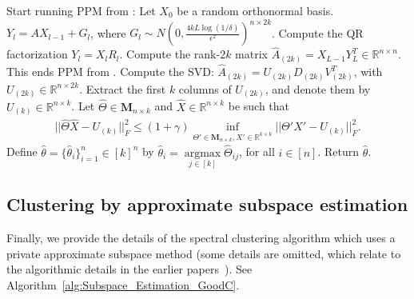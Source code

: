 \documentclass{article}
\begin{document}
\begin{algorithm}[h!]
\caption{Spectral Clustering via Matrix Estimation}
\label{alg:Matrix_Estimation_hardt2014}
\begin{algorithmic}[1]
    \State Start running PPM from \cite{hardt2014noisy}: Let $X_0$ be a random orthonormal basis.
    \State $Y_l = AX_{l - 1} +G_l$, where $G_l \sim N\left(0, \frac{4kL\log(1/\delta)}{\epsilon^2}\right)^{n \times 2k}$.
    \State Compute the QR factorization $Y_l = X_lR_l$.
    \EndFor
    \State Compute the rank-$2k$ matrix $\hat{A}_{(2k)} = X_{L - 1}Y_L^T \in \mathbb{R}^{n \times n}$. This ends PPM from \cite{hardt2014noisy}.
    \State Compute the SVD: $\hat{A}_{(2k)} = U_{(2k)}D_{(2k)}V_{(2k)}^T$, with $U_{(2k)} \in \mathbb{R}^{n \times 2k}$. Extract the first $k$ columns of $U_{(2k)}$, and denote them by $U_{(k)} \in \mathbb{R}^{n \times k}$.
    \State Let $\hat{\Theta} \in \mathbf{M}_{n\times k}$ and $\hat{X} \in \mathbb{R}^{n \times k}$ be such that 
    \begin{align*}
        ||\hat{\Theta}\hat{X} - U_{(k)}||_F^2 \leq (1 + \gamma)\mathop{\inf}\limits_{\Theta' \in \mathbf{M}_{n\times k}, X' \in \mathbb{R}^{k \times k}}||\Theta'X' - U_{(k)}||_F^2.
    \end{align*}
    \State Define $\hat{\theta} = \{\hat{\theta}_i\}_{i = 1}^n \in [k]^n$ by $\hat{\theta}_i = \mathop{\arg\max}\limits_{j \in [k]}\hat{\Theta}_{ij}$, for all $i \in [n]$.
    \State Return $\hat{\theta}$.
\EndFunction
\end{algorithmic}
\end{algorithm}


\subsection{Clustering by approximate subspace estimation}
\label{AppSCSubspace}

Finally, we provide the details of the spectral clustering algorithm which uses a private approximate subspace method (some details are omitted, which relate to the algorithmic details in the earlier papers~\cite{SinSte21, KamEtal22, mahpud2022differentially}). See Algorithm~\ref{alg:Subspace_Estimation_GoodC}.
\end{document}
